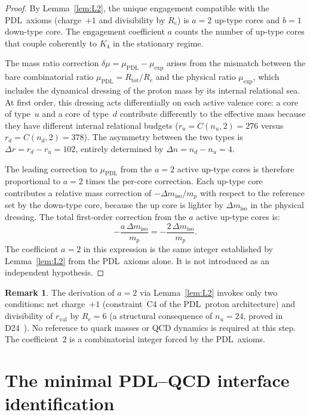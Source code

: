 \documentclass[11pt,a4paper]{article}
\theoremstyle{definition}
\newtheorem{remark}[theorem]{Remark}
\newcommand{\PDL}{\textnormal{PDL}}
\newcommand{\Rtot}{R_{\mathrm{tot}}}
\newcommand{\rval}{r_{\mathrm{val}}}
\newcommand{\Kfour}{K_4}
\newcommand{\muPDL}{\mu_{\mathrm{PDL}}}
\newcommand{\muexp}{\mu_{\mathrm{exp}}}
\newcommand{\dmu}{\delta\mu}
\newcommand{\dmiso}{\Delta m_{\mathrm{iso}}}
\newcommand{\Ree}{R_e}
\begin{document}
\begin{proof}
By Lemma~\ref{lem:L2}, the unique engagement compatible with the \PDL\ axioms (charge~$+1$ and divisibility by $\Ree$) is $a = 2$ up-type cores and $b = 1$ down-type core. The engagement coefficient $a$ counts the number of up-type cores that couple coherently to $\Kfour$ in the stationary regime.

The mass ratio correction $\dmu = \muPDL - \muexp$ arises from the mismatch between the bare combinatorial ratio $\muPDL = \Rtot/\Ree$ and the physical ratio $\muexp$, which includes the dynamical dressing of the proton mass by its internal relational sea. At first order, this dressing acts differentially on each active valence core: a core of type~$u$ and a core of type~$d$ contribute differently to the effective mass because they have different internal relational budgets ($r_u = C(n_u,2) = 276$ versus $r_d = C(n_d,2) = 378$). The asymmetry between the two types is $\Delta r = r_d - r_u = 102$, entirely determined by $\Delta n = n_d - n_u = 4$.

The leading correction to $\muPDL$ from the $a = 2$ active up-type cores is therefore proportional to $a = 2$ times the per-core correction. Each up-type core contributes a relative mass correction of $-\dmiso/m_p$ with respect to the reference set by the down-type core, because the up core is lighter by $\dmiso$ in the physical dressing. The total first-order correction from the $a$ active up-type cores is:
\begin{equation}
-\frac{a\,\dmiso}{m_p} = -\frac{2\,\dmiso}{m_p}.
\label{eq:a_correction}
\end{equation}
The coefficient $a = 2$ in this expression is the same integer established by Lemma~\ref{lem:L2} from the \PDL\ axioms alone. It is not introduced as an independent hypothesis.
\end{proof}

\begin{remark}
The derivation of $a = 2$ via Lemma~\ref{lem:L2} invokes only two conditions: net charge~$+1$ (constraint~C4 of the \PDL\ proton architecture) and divisibility of $\rval$ by $\Ree = 6$ (a structural consequence of $n_u = 24$, proved in D24~\cite{Bridge_PDL_2026}). No reference to quark masses or QCD dynamics is required at this step. The coefficient~$2$ is a combinatorial integer forced by the \PDL\ axioms.
\end{remark}

\section{The minimal PDL--QCD interface identification}
\label{sec:interface}
\end{document}

